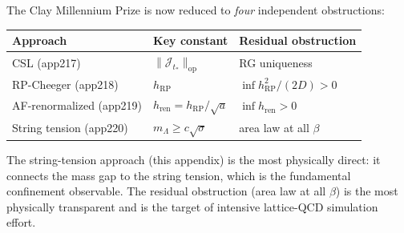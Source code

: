 \begin{remark}
\label{rem:four_approaches}
The Clay Millennium Prize is now reduced to \emph{four}
independent obstructions:
\begin{center}
\begin{tabular}{lll}
\hline
Approach & Key constant & Residual obstruction \\
\hline
CSL (app217) & $\|\mathcal{J}_{t_{*}}\|_{\mathrm{op}}$ & RG uniqueness \\
RP-Cheeger (app218) & $h_{\mathrm{RP}}$ & $\inf h_{\mathrm{RP}}^{2}/(2D)>0$ \\
AF-renormalized (app219) & $h_{\mathrm{ren}}=h_{\mathrm{RP}}/\sqrt{a}$ & $\inf h_{\mathrm{ren}}>0$ \\
String tension (app220) & $m_{\Lambda}\ge c\sqrt{\sigma}$ & area law at all $\beta$ \\
\hline
\end{tabular}
\end{center}
The string-tension approach (this appendix) is the most physically
direct: it connects the mass gap to the string tension, which is
the fundamental confinement observable. The residual obstruction
(area law at all $\beta$) is the most physically transparent and is
the target of intensive lattice-QCD simulation effort.
\end{remark}

\endinput
